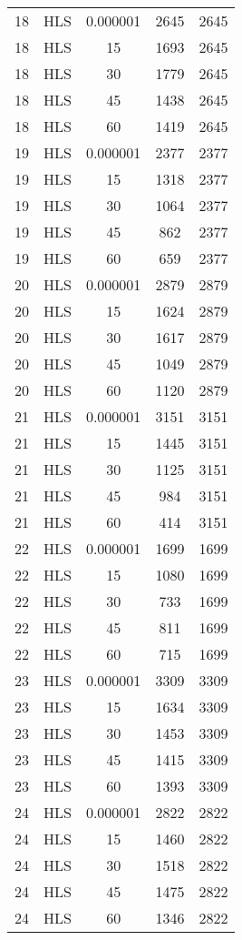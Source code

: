 \begin{center}
\begin{longtable}{ccccc}
18	&	HLS	&	0.000001	&	2645	&	2645	\\
18	&	HLS	&	15	&	1693	&	2645	\\
18	&	HLS	&	30	&	1779	&	2645	\\
18	&	HLS	&	45	&	1438	&	2645	\\
18	&	HLS	&	60	&	1419	&	2645	\\
19	&	HLS	&	0.000001	&	2377	&	2377	\\
19	&	HLS	&	15	&	1318	&	2377	\\
19	&	HLS	&	30	&	1064	&	2377	\\
19	&	HLS	&	45	&	862	&	2377	\\
19	&	HLS	&	60	&	659	&	2377	\\
20	&	HLS	&	0.000001	&	2879	&	2879	\\
20	&	HLS	&	15	&	1624	&	2879	\\
20	&	HLS	&	30	&	1617	&	2879	\\
20	&	HLS	&	45	&	1049	&	2879	\\
20	&	HLS	&	60	&	1120	&	2879	\\
21	&	HLS	&	0.000001	&	3151	&	3151	\\
21	&	HLS	&	15	&	1445	&	3151	\\
21	&	HLS	&	30	&	1125	&	3151	\\
21	&	HLS	&	45	&	984	&	3151	\\
21	&	HLS	&	60	&	414	&	3151	\\
22	&	HLS	&	0.000001	&	1699	&	1699	\\
22	&	HLS	&	15	&	1080	&	1699	\\
22	&	HLS	&	30	&	733	&	1699	\\
22	&	HLS	&	45	&	811	&	1699	\\
22	&	HLS	&	60	&	715	&	1699	\\
23	&	HLS	&	0.000001	&	3309	&	3309	\\
23	&	HLS	&	15	&	1634	&	3309	\\
23	&	HLS	&	30	&	1453	&	3309	\\
23	&	HLS	&	45	&	1415	&	3309	\\
23	&	HLS	&	60	&	1393	&	3309	\\
24	&	HLS	&	0.000001	&	2822	&	2822	\\
24	&	HLS	&	15	&	1460	&	2822	\\
24	&	HLS	&	30	&	1518	&	2822	\\
24	&	HLS	&	45	&	1475	&	2822	\\
24	&	HLS	&	60	&	1346	&	2822	\\
\end{longtable}    
\end{center}









